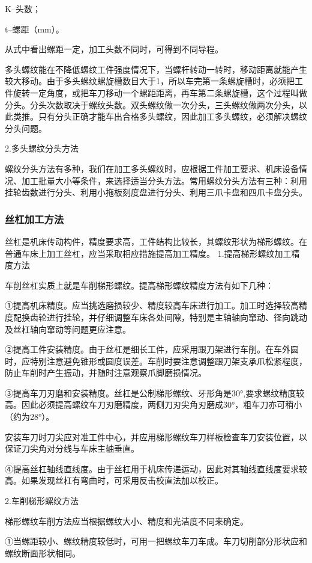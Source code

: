\documentclass{ctexbook}
\begin{document}
K--头数；

t--螺距（mm）。

从式中看出螺距一定，加工头数不同时，可得到不同导程。

多头螺纹能在不降低螺纹工件强度情况下，当螺杆转动一转时，移动距离就能产生较大移动。由于多头螺纹螺旋槽数目大于1，所以车完第一条螺旋槽时，必须把工件旋转一定角度，或把车刀移动一个螺距距离，再车第二条螺旋槽，这个过程叫做分头。分头次数取决于螺纹头数。双头螺纹做一次分头，三头螺纹做两次分头，以此类推。只有分头正确才能车出合格多头螺纹，因此加工多头螺纹，必须解决螺纹分头问题。

2.多头螺纹分头方法

螺纹分头方法有多种，我们在加工多头螺纹时，应根据工件加工要求、机床设备情况、加工批量大小等条件，来选择适当分头方法。常用螺纹分头方法有三种：利用挂轮齿数进行分头、利用小拖板刻度盘进行分头、利用三爪卡盘和四爪卡盘分头。
\subsubsection{丝杠加工方法}
丝杠是机床传动构件，精度要求高，工件结构比较长，其螺纹形状为梯形螺纹。在普通车床上加工丝杠，应当采取相应措施提高加工精度。
1.提高梯形螺纹加工精度方法

车削丝杠实质上就是车削梯形螺纹。提高梯形螺纹精度方法有如下几种：

①提高机床精度。应当挑选磨损较少、精度较高车床进行加工。加工时选择较高精度配换齿轮进行挂轮，并仔细调整车床各处间隙，特别是主轴轴向窜动、径向跳动及丝杠轴向窜动等问题更应注意。	

②提高工件安装精度。由于丝杠是细长工件，应采用跟刀架进行车削。在车外圆时，应特别注意避免锥形或圆度误差。车削时要注意调整跟刀架支承爪松紧程度，防止车削时产生振动，并随时注意观察爪脚磨损情况。

③提高车刀刃磨和安装精度。丝杠是公制梯形螺纹、牙形角是30°,要求螺纹精度较高。因此必须提高螺纹车刀刃磨精度，两侧刀刃尖角刃磨成30°，粗车刀亦可稍小（约为28°）。

安装车刀时刀尖应对准工件中心，并应用梯形螺纹车刀样板检查车刀安装位置，以保证刀尖角对分线与车床主轴垂直。

④提高丝杠轴线直线度。由于丝杠用于机床传递运动，因此对其轴线直线度要求较高。如果发现丝杠有弯曲时，可采用反击校直法加以校正。

2.车削梯形螺纹方法

梯形螺纹车削方法应当根据螺纹大小、精度和光洁度不同来确定。

①当螺距较小、螺纹精度较低时，可用一把螺纹车刀车成。车刀切削部分形状应和螺纹断面形状相同。
\end{document}
